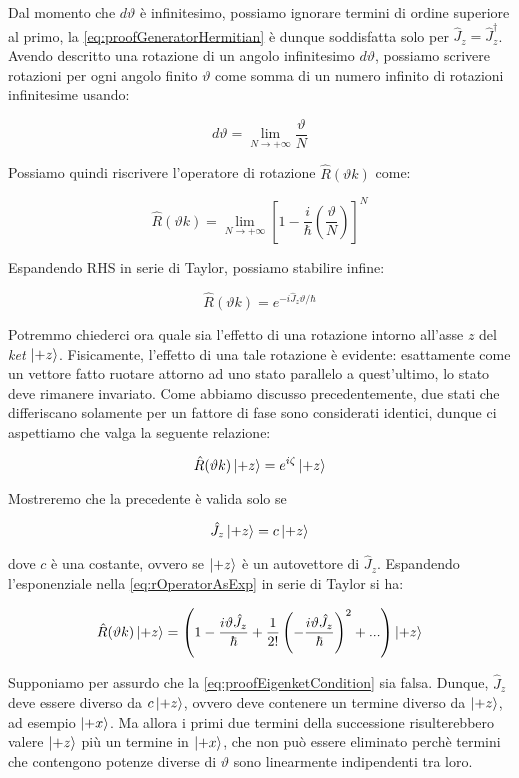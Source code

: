 Dal momento che $d \vartheta$ \`e infinitesimo, possiamo ignorare termini di ordine superiore al primo, la \eqref{eq:proofGeneratorHermitian} \`e dunque soddisfatta solo per $\hat{J}_z = \hat{J}^\dagger_z$. Avendo descritto una rotazione di un angolo infinitesimo $d \vartheta$, possiamo scrivere rotazioni per ogni angolo finito $\vartheta$ come somma di un numero infinito di rotazioni infinitesime usando:

	\[
		d \vartheta = \lim_{N \to +\infty} \frac{\vartheta}{N}
	\]

Possiamo quindi riscrivere l'operatore di rotazione $\hat{R} (\vartheta k )$ come:

	\begin{equation}
		\hat{R} (\vartheta k ) = \lim_{N \to +\infty} \left [ 1 - \frac{i}{\hbar} \left ( \frac {\vartheta}{N} \right ) \right ] ^ N
	\end{equation}

Espandendo RHS in serie di Taylor, possiamo stabilire infine:

	\begin{equation} \label{eq:rOperatorAsExp}
		\hat{R} (\vartheta k ) = e ^ {-i \hat{J}_z \vartheta / \hbar}
	\end{equation}

Potremmo chiederci ora quale sia l'effetto di una rotazione intorno all'asse $z$ del \textit{ket} $\ket{+z}$. Fisicamente, l'effetto di una tale rotazione \`e evidente: esattamente come un vettore fatto ruotare attorno ad uno stato parallelo a quest'ultimo, lo stato deve rimanere invariato. Come abbiamo discusso precedentemente, due stati che differiscano solamente per un fattore di fase sono considerati identici, dunque ci aspettiamo che valga la seguente relazione:

	\begin{equation}
		\hat{R} (\vartheta k) \ket{+z} = e^{i \zeta} \ket{+z}
	\end{equation}

Mostreremo che la precedente \`e valida solo se

	\begin{equation} \label{eq:proofEigenketCondition}
		\hat{J}_z \ket{+z} = c \ket{+z}
	\end{equation}

dove $c$ \`e una costante, ovvero se $\ket{+z}$ \`e un autovettore di $\hat{J}_z$. Espandendo l'esponenziale nella \eqref{eq:rOperatorAsExp} in serie di Taylor si ha:

	\begin{equation}
		\hat{R} (\vartheta k) \ket{+z} = \left ( 1 - \frac{i \vartheta \hat{J}_z}{\hbar} + \frac{1}{2!} \left ( - \frac{i \vartheta \hat{J}_z}{\hbar} \right )^2 + ... \right ) \ket{+z}
	\end {equation}

Supponiamo per assurdo che la \eqref{eq:proofEigenketCondition} sia falsa. Dunque, $\hat{J}_z$ deve essere diverso da $c \ket{+z}$, ovvero deve contenere un termine diverso da $\ket{+z}$, ad esempio $\ket{+x}$. Ma allora i primi  due termini della successione risulterebbero valere $\ket{+z}$ pi\`u un termine in $\ket{+x}$, che non pu\`o essere eliminato perch\`e termini che contengono potenze diverse di $\vartheta$ sono linearmente indipendenti tra loro.
